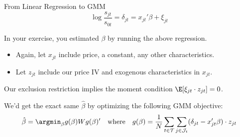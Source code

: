 \documentclass[aspectratio=169,t,11pt,table]{beamer}
\begin{document}
\begin{frame}{From Linear Regression to GMM}
    \vspace{-\baselineskip}
    \begin{equation*}
        \log\frac{s_{jt}}{s_{0t}} = \delta_{jt} = x_{jt}'\beta + \xi_{jt}
    \end{equation*}
    \vspace{-0.5\baselineskip}
    \begin{wideitemize}
        \item In your exercise, you estimated $\beta$ by running the above regression.
        \begin{itemize}
            \item Again, let $x_{jt}$ include price, a constant, any other characteristics.
            \item Let $z_{jt}$ include our price IV and exogenous characteristics in $x_{jt}$.
        \end{itemize}
        \pause
        \item Our exclusion restriction implies the moment condition $\E[\xi_{jt} \cdot z_{jt}] = 0$.
        \pause
        \item We'd get the exact same $\hat{\beta}$ by optimizing the following GMM objective:
        \begin{equation*}
            \hat{\beta} = \argmin_\beta g(\beta) W g(\beta)' \quad\text{where}\quad g(\beta) = \frac{1}{N} \sum_{t \in \mathcal{T}} \sum_{j \in \mathcal{J}_t} (\delta_{jt} - x_{jt}'\beta) \cdot z_{jt}
        \end{equation*}
    \end{wideitemize}
\end{frame}
\end{document}
